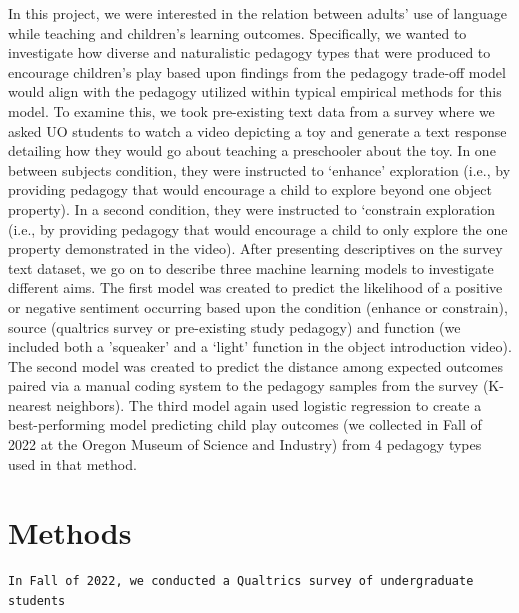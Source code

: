\documentclass[
  english,
  man]{apa6}
\begin{document}
In this project, we were interested in the relation between adults' use of language while teaching and children's learning outcomes. Specifically, we wanted to investigate how diverse and naturalistic pedagogy types that were produced to encourage children's play based upon findings from the pedagogy trade-off model would align with the pedagogy utilized within typical empirical methods for this model. To examine this, we took pre-existing text data from a survey where we asked UO students to watch a video depicting a toy and generate a text response detailing how they would go about teaching a preschooler about the toy. In one between subjects condition, they were instructed to `enhance' exploration (i.e., by providing pedagogy that would encourage a child to explore beyond one object property). In a second condition, they were instructed to `constrain exploration (i.e., by providing pedagogy that would encourage a child to only explore the one property demonstrated in the video).
After presenting descriptives on the survey text dataset, we go on to describe three machine learning models to investigate different aims. The first model was created to predict the likelihood of a positive or negative sentiment occurring based upon the condition (enhance or constrain), source (qualtrics survey or pre-existing study pedagogy) and function (we included both a 'squeaker' and a `light' function in the object introduction video). The second model was created to predict the distance among expected outcomes paired via a manual coding system to the pedagogy samples from the survey (K-nearest neighbors). The third model again used logistic regression to create a best-performing model predicting child play outcomes (we collected in Fall of 2022 at the Oregon Museum of Science and Industry) from 4 pedagogy types used in that method.

\hypertarget{methods}{%
\section{Methods}\label{methods}}

\begin{verbatim}
In Fall of 2022, we conducted a Qualtrics survey of undergraduate students 
\end{verbatim}
\end{document}
